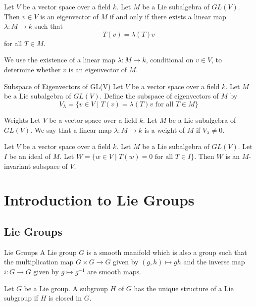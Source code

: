 \documentclass[a4paper]{article}
\begin{document}
\begin{lmm}{}{} Let $V$ be a vector space over a field $k$. Let $M$ be a Lie subalgebra of $GL(V)$. Then $v\in V$ is an eigenvector of $M$ if and only if there exists a linear map $\lambda:M\to k$ such that $$T(v)=\lambda(T)v$$ for all $T\in M$. 
\end{lmm}

We use the existence of a linear map $\lambda:M\to k$, conditional on $v\in V$, to determine whether $v$ is an eigenvector of $M$. 

\begin{defn}{Subspace of Eigenvectors of GL(V)}{} Let $V$ be a vector space over a field $k$. Let $M$ be a Lie subalgebra of $GL(V)$. Define the subspace of eigenvectors of $M$ by $$V_\lambda=\{v\in V\;|\;T(v)=\lambda(T)v\text{ for all }T\in M\}$$
\end{defn}

\begin{defn}{Weights}{} Let $V$ be a vector space over a field $k$. Let $M$ be a Lie subalgebra of $GL(V)$. We say that a linear map $\lambda:M\to k$ is a weight of $M$ if $V_\lambda\neq 0$. 
\end{defn}

\begin{lmm}{}{} Let $V$ be a vector space over a field $k$. Let $M$ be a Lie subalgebra of $GL(V)$. Let $I$ be an ideal of $M$. Let $W=\{w\in V\;|\;T(w)=0\text{ for all }T\in I\}$. Then $W$ is an $M$-invariant subspace of $V$. 
\end{lmm}

\pagebreak
\section{Introduction to Lie Groups}
\subsection{Lie Groups}
\begin{defn}{Lie Groups}{} A Lie group $G$ is a smooth manifold which is also a group such that the multiplication map $G\times G\to G$ given by $(g,h)\mapsto gh$ and the inverse map $i:G\to G$ given by $g\mapsto g^{-1}$ are smooth maps. 
\end{defn}

\begin{prp}{}{} Let $G$ be a Lie group. A subgroup $H$ of $G$ has the unique structure of a Lie subgroup if $H$ is closed in $G$. 
\end{prp}
\end{document}

